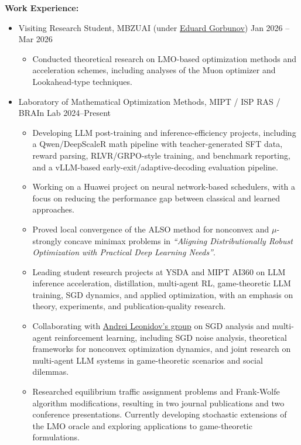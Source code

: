 \documentclass[a4paper, fontsize=11pt]{article}
\begin{document}
\textbf{Work Experience:}
\begin{itemize}
    \item Visiting Research Student, MBZUAI (under \href{https://scholar.google.com/citations?user=QPVriwoAAAAJ&hl=ru&oi=ao}{Eduard Gorbunov}) \hfill Jan 2026 -- Mar 2026
\begin{itemize}
    \item Conducted theoretical research on LMO-based optimization methods and acceleration schemes, including analyses of the Muon optimizer and Lookahead-type techniques.
\end{itemize}

    \item Laboratory of Mathematical Optimization Methods, MIPT / ISP RAS / BRAIn Lab \hfill 2024--Present
    \begin{itemize}
        \item Developing LLM post-training and inference-efficiency projects, including a Qwen/DeepScaleR math pipeline with teacher-generated SFT data, reward parsing, RLVR/GRPO-style training, and benchmark reporting, and a vLLM-based early-exit/adaptive-decoding evaluation pipeline.

        \item Working on a Huawei project on neural network-based schedulers, with a focus on reducing the performance gap between classical and learned approaches.
        \item Proved local convergence of the ALSO method for nonconvex and $\mu$-strongly concave minimax problems in \textit{``Aligning Distributionally Robust Optimization with Practical Deep Learning Needs''}.

        \item Leading student research projects at YSDA and MIPT AI360 on LLM inference acceleration, distillation, multi-agent RL, game-theoretic LLM training, SGD dynamics, and applied optimization, with an emphasis on theory, experiments, and publication-quality research.

        \item Collaborating with \href{https://scholar.google.com/citations?user=RNnvD3wAAAAJ\&hl=en}{Andrei Leonidov's group} on SGD analysis and multi-agent reinforcement learning, including SGD noise analysis, theoretical frameworks for nonconvex optimization dynamics, and joint research on multi-agent LLM systems in game-theoretic scenarios and social dilemmas.

        \item Researched equilibrium traffic assignment problems and Frank-Wolfe algorithm modifications, resulting in two journal publications and two conference presentations. Currently developing stochastic extensions of the LMO oracle and exploring applications to game-theoretic formulations.


\end{itemize}
\end{itemize}
\end{document}
